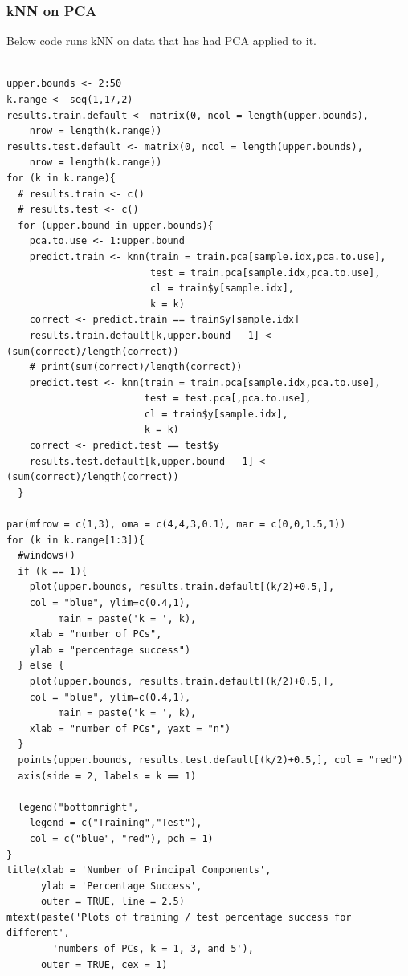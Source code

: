 \documentclass[11pt]{article} %
\begin{document}
\subsubsection{kNN on PCA}
\label{code-pca_knn}

Below code runs kNN on data that has had PCA applied to it. 

\begin{lstlisting}

upper.bounds <- 2:50
k.range <- seq(1,17,2)
results.train.default <- matrix(0, ncol = length(upper.bounds), 
	nrow = length(k.range))
results.test.default <- matrix(0, ncol = length(upper.bounds), 
	nrow = length(k.range))
for (k in k.range){
  # results.train <- c()
  # results.test <- c()
  for (upper.bound in upper.bounds){
    pca.to.use <- 1:upper.bound
    predict.train <- knn(train = train.pca[sample.idx,pca.to.use], 
                         test = train.pca[sample.idx,pca.to.use],
                         cl = train$y[sample.idx],
                         k = k)
    correct <- predict.train == train$y[sample.idx]
    results.train.default[k,upper.bound - 1] <- (sum(correct)/length(correct))
    # print(sum(correct)/length(correct))
    predict.test <- knn(train = train.pca[sample.idx,pca.to.use], 
                        test = test.pca[,pca.to.use],
                        cl = train$y[sample.idx],
                        k = k)
    correct <- predict.test == test$y
    results.test.default[k,upper.bound - 1] <- (sum(correct)/length(correct))
  }
  
par(mfrow = c(1,3), oma = c(4,4,3,0.1), mar = c(0,0,1.5,1))
for (k in k.range[1:3]){  
  #windows()
  if (k == 1){ 
    plot(upper.bounds, results.train.default[(k/2)+0.5,], 
	col = "blue", ylim=c(0.4,1), 
         main = paste('k = ', k), 
	xlab = "number of PCs", 
	ylab = "percentage success")
  } else {
    plot(upper.bounds, results.train.default[(k/2)+0.5,], 
	col = "blue", ylim=c(0.4,1), 
         main = paste('k = ', k), 
	xlab = "number of PCs", yaxt = "n")
  }
  points(upper.bounds, results.test.default[(k/2)+0.5,], col = "red")
  axis(side = 2, labels = k == 1)
  
  legend("bottomright", 
	legend = c("Training","Test"), 
	col = c("blue", "red"), pch = 1)
}
title(xlab = 'Number of Principal Components', 
      ylab = 'Percentage Success',
      outer = TRUE, line = 2.5)
mtext(paste('Plots of training / test percentage success for different', 
	    'numbers of PCs, k = 1, 3, and 5'), 
      outer = TRUE, cex = 1)


\end{lstlisting}
\end{document}
